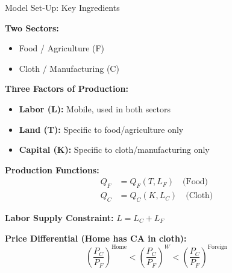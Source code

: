 \documentclass{beamer}
\begin{document}
\begin{frame}{Model Set-Up: Key Ingredients}

\textbf{Two Sectors:}
\begin{itemize}
    \item Food / Agriculture (F)
    \item Cloth / Manufacturing (C)
\end{itemize}

\vspace{0.2cm}

\textbf{Three Factors of Production:}
\begin{itemize}
    \item \textcolor{laborcolor}{\textbf{Labor (L):}} Mobile, used in both sectors
    \item \textcolor{landcolor}{\textbf{Land (T):}} Specific to food/agriculture only
    \item \textcolor{capitalcolor}{\textbf{Capital (K):}} Specific to cloth/manufacturing only
\end{itemize}

\vspace{0.2cm}

\textbf{Production Functions:}
\begin{align*}
Q_F &= Q_F(T, L_F) \quad \text{(Food)} \\
Q_C &= Q_C(K, L_C) \quad \text{(Cloth)}
\end{align*}

\textbf{Labor Supply Constraint:} $L = L_C + L_F$

\vspace{0.2cm}

\textbf{Price Differential (Home has CA in cloth):}
$$\left(\frac{P_C}{P_F}\right)^{\text{Home}} < \left(\frac{P_C}{P_F}\right)^{W} < \left(\frac{P_C}{P_F}\right)^{\text{Foreign}}$$

\end{frame}
\end{document}
